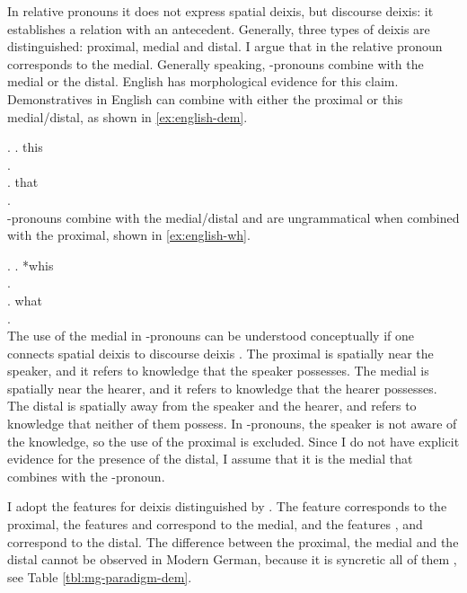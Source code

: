 In relative pronouns it does not express spatial deixis, but discourse deixis: it establishes a relation with an antecedent.
Generally, three types of deixis are distinguished: proximal, medial and distal. I argue that  in the relative pronoun corresponds to the medial. Generally speaking, -pronouns combine with the medial or the distal. English has morphological evidence for this claim. Demonstratives in English can combine with either the proximal or this medial/distal, as shown in \ref{ex:english-dem}.

\ex.\label{ex:english-dem}
 \ag. this\\
 .\\
 \bg. that\\
 .\\

-pronouns combine with the medial/distal and are ungrammatical when combined with the proximal, shown in \ref{ex:english-wh}.

\ex.\label{ex:english-wh}
 \ag. *whis\\
 .\\
 \bg. what\\
 .\\

The use of the medial in -pronouns can be understood conceptually if one connects spatial deixis to discourse deixis \citep[cf.][]{colasanti2019}. The proximal is spatially near the speaker, and it refers to knowledge that the speaker possesses. The medial is spatially near the hearer, and it refers to knowledge that the hearer possesses. The distal is spatially away from the speaker and the hearer, and refers to knowledge that neither of them possess. In -pronouns, the speaker is not aware of the knowledge, so the use of the proximal is excluded. Since I do not have explicit evidence for the presence of the distal, I assume that it is the medial that combines with the -pronoun.

I adopt the features for deixis distinguished by \citet{lander2018}. The feature  corresponds to the proximal, the features  and  correspond to the medial, and the features ,  and  correspond to the distal.
The difference between the proximal, the medial and the distal cannot be observed in Modern German, because it is syncretic all of them , see Table \ref{tbl:mg-paradigm-dem}.

